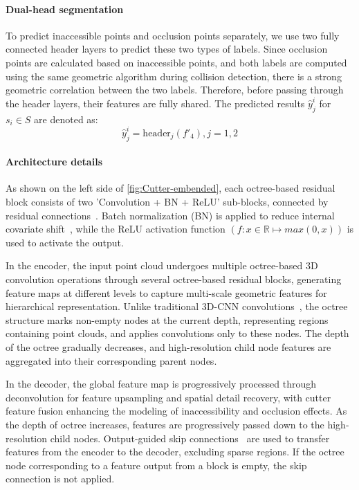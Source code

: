 \paragraph{Dual-head segmentation} 
To predict inaccessible points and occlusion points separately, we use two fully connected header layers to predict these two types of labels. Since occlusion points are calculated based on inaccessible points, and both labels are computed using the same geometric algorithm during collision detection, there is a strong geometric correlation between the two labels. Therefore, before passing through the header layers, their features are fully shared. The predicted results $\hat{y}^i_j$ for $s_i \in S$ are denoted as:
\begin{equation} 
\hat{y}^i_j = \text{header}_j(f'_4), j=1,2
\end{equation}


\paragraph{Architecture details} 
As shown on the left side of \autoref{fig:Cutter-embended}, each octree-based residual block consists of two 'Convolution + BN + ReLU' sub-blocks, connected by residual connections~\cite{he2016deep}. Batch normalization (BN) is applied to reduce internal covariate shift~\cite{ioffe2015batch}, while the ReLU activation function $(f : x \in \mathbb{R} \longmapsto max(0,x))$ is used to activate the output.

In the encoder, the input point cloud undergoes multiple octree-based 3D convolution operations through several octree-based residual blocks, generating feature maps at different levels to capture multi-scale geometric features for hierarchical representation. Unlike traditional 3D-CNN convolutions~\cite{maturana2015voxnet}, the octree structure marks non-empty nodes at the current depth, representing regions containing point clouds, and applies convolutions only to these nodes. 
The depth of the octree gradually decreases, and high-resolution child node features are aggregated into their corresponding parent nodes.


In the decoder, the global feature map is progressively processed through deconvolution for feature upsampling and spatial detail recovery, with cutter feature fusion enhancing the modeling of inaccessibility and occlusion effects.
As the depth of octree increases, features are progressively passed down to the high-resolution child nodes.
Output-guided skip connections~\cite{wang2020deep} are used to transfer features from the encoder to the decoder, excluding sparse regions. If the octree node corresponding to a feature output from a block is empty, the skip connection is not applied.


